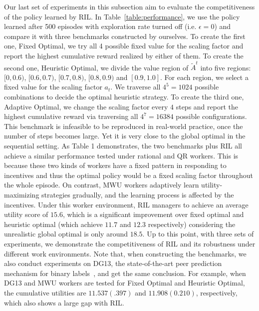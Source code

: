 \documentclass{article}
\begin{document}
Our last set of experiments in this subsection aim to evaluate the competitiveness of the policy learned by RIL. In Table~\ref{table:performance}, we use the policy learned after 500 episodes with exploration rate turned off (i.e. $\epsilon =0$) and compare it with three benchmarks constructed by ourselves. To create the first one, Fixed Optimal, we try all 4 possible fixed value for the scaling factor and report the highest cumulative reward realized by either of them.
To create the second one, Heuristic Optimal, we divide the value region of $\tilde{A}^t$ into five regions: $[0,0.6)$, $[0.6,0.7)$, $[0.7,0.8)$, $[0.8,0.9)$ and $[0.9,1.0]$. For each region, we select a fixed value for the scaling factor $a_t$. We traverse all $4^5=1024$ possible combinations to decide the optimal heuristic strategy.
To create the third one, Adaptive Optimal, we change the scaling factor every $4$ steps and report the highest cumulative reward via traversing all $4^7=16384$ possible configurations. This benchmark is infeasible to be reproduced in real-world practice, once the number of steps becomes large. Yet it is very close to the global optimal in the sequential setting.
As Table 1 demonstrates, the two benchmarks plus RIL all achieve a similar performance tested under rational and QR workers.
This is because these two kinds of workers have a fixed pattern in responding to incentives and thus the optimal policy would be a fixed scaling factor throughout the whole episode.
On contrast, MWU workers adaptively learn utility-maximizing strategies gradually, and the learning process is affected by the incentives. Under this worker environment, RIL managers to achieve an average utility score of $15.6$, which is a significant improvement over fixed optimal and heuristic optimal (which achieve $11.7$ and $12.3$ respectively) considering the unrealistic global optimal is only around $18.5$. Up to this point, with three sets of experiments, we demonstrate the competitiveness of RIL and its robustness under different work environments.
Note that, when constructing the benchmarks, we also conduct experiments on DG13, the state-of-the-art peer prediction mechanism for binary labels~\cite{dasgupta2013crowdsourced}, and get the same conclusion.
For example, when DG13 and MWU workers are tested for Fixed Optimal and Heuristic Optimal, the cumulative utilities are $11.537 (.397)$ and $11.908 (0.210)$, respectively, which also shows a large gap with RIL.
\end{document}
